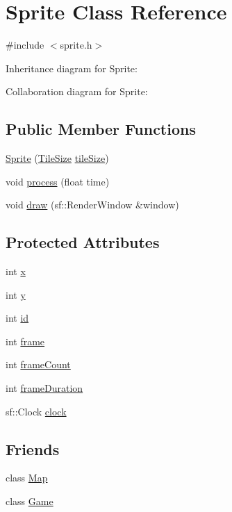\hypertarget{classSprite}{}\section{Sprite Class Reference}
\label{classSprite}


{\ttfamily \#include $<$sprite.\+h$>$}



Inheritance diagram for Sprite\+:


Collaboration diagram for Sprite\+:
\subsection*{Public Member Functions}
\begin{DoxyCompactItemize}
\item 
\hyperlink{classSprite_ad86ed422c12285a96dd158cf535f7449}{Sprite} (\hyperlink{structTileSize}{Tile\+Size} \hyperlink{classObject_a40a932c0593ca2687eebc518b2c84c71}{tile\+Size})
\item 
void \hyperlink{classSprite_a852ed249ba3b41700dfcae12bf04c56b}{process} (float time)
\item 
void \hyperlink{classSprite_adf1e840c7fe51abacc8a8f80c9e63c81}{draw} (sf\+::\+Render\+Window \&window)
\end{DoxyCompactItemize}
\subsection*{Protected Attributes}
\begin{DoxyCompactItemize}
\item 
int \hyperlink{classSprite_ab36028dcefdd4bf024c52c8d9519a283}{x}
\item 
int \hyperlink{classSprite_a363e26017ee2aaed8636f7dab92af2cd}{y}
\item 
int \hyperlink{classSprite_a173701f829c18e742a363f3b9780ac06}{id}
\item 
int \hyperlink{classSprite_abdcdaf5dc3b8842622536f318d6daac3}{frame}
\item 
int \hyperlink{classSprite_a8dc8d5c9530bad6113d37fe5e53e4668}{frame\+Count}
\item 
int \hyperlink{classSprite_afccc80a82c0a1c2cbc80edfbe1ca5c18}{frame\+Duration}
\item 
sf\+::\+Clock \hyperlink{classSprite_aef3f5fc132fdf803f6796d204bba9007}{clock}
\end{DoxyCompactItemize}
\subsection*{Friends}
\begin{DoxyCompactItemize}
\item 
class \hyperlink{classSprite_ad2f32e921244459f7cc6d50355429cc6}{Map}
\item 
class \hyperlink{classSprite_aa2fab026580d6f14280c2ffb8063a314}{Game}
\end{DoxyCompactItemize}
